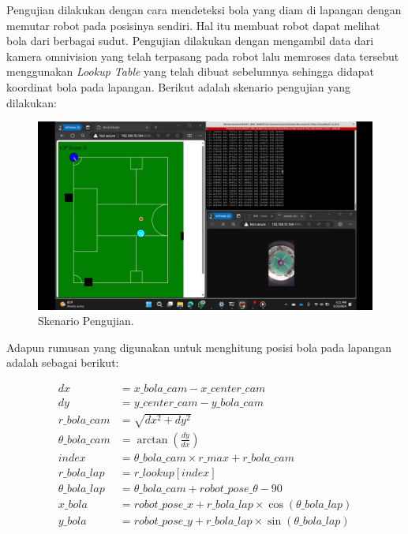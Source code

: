 Pengujian dilakukan dengan cara mendeteksi bola yang diam di lapangan dengan memutar robot pada posisinya sendiri. Hal itu membuat robot dapat melihat bola dari berbagai sudut. Pengujian dilakukan dengan mengambil data dari kamera omnivision yang telah terpasang pada robot lalu memroses data tersebut menggunakan \emph{Lookup Table} yang telah dibuat sebelumnya sehingga didapat koordinat bola pada lapangan. Berikut adalah skenario pengujian yang dilakukan: 

\begin{figure}[H]
  \centering
  \includegraphics[scale=0.20]{gambar/saat_putar_bola.png}
  \caption{Skenario Pengujian.}
  \label{fig:skenariopengujian}
\end{figure}

Adapun rumusan yang digunakan untuk menghitung posisi bola pada lapangan adalah sebagai berikut: 

\begin{equation}
  \begin{aligned}
    dx &= x\_bola\_cam - x\_center\_cam \\
    dy &= y\_center\_cam - y\_bola\_cam \\
    r\_bola\_cam &= \sqrt{dx^2 + dy^2} \\
    \theta\_bola\_cam &= \arctan(\frac{dy}{dx}) \\
    index &= \theta\_bola\_cam \times r\_max + r\_bola\_cam \\ 
    r\_bola\_lap &= r\_lookup[index] \\
    \theta\_bola\_lap &= \theta\_bola\_cam + robot\_pose\_\theta - 90 \\
    x\_bola &= robot\_pose\_x + r\_bola\_lap \times \cos(\theta\_bola\_lap) \\
    y\_bola &= robot\_pose\_y + r\_bola\_lap \times \sin(\theta\_bola\_lap) \\
  \end{aligned}
\end{equation}

